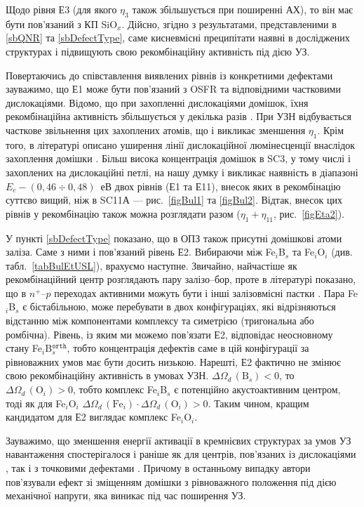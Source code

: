 Щодо рівня Е3 (для якого $\eta_3$ також збільшується при поширенні АХ),
то він має бути пов'язаний з КП SiO$_x$.
Дійсно, згідно з результатами, представленими в \ref{sbQNR} та \ref{sbDefectType},
саме кисневмісні преципітати наявні в досліджених структурах і підвищують свою рекомбінаційну активність під дією УЗ.

Повертаючись до співставлення виявлених рівнів із конкретними дефектами зауважимо,
що Е1 може бути пов'язаний з OSFR та відповідними частковими дислокаціями.
Відомо, що при захопленні дислокаціями домішок, їхня рекомбінаційна активність
збільшується у декілька разів \cite{disl10:Kveder,Kittler2003}.
При УЗН відбувається часткове звільнення цих захоплених атомів, що і викликає
зменшення  $\eta_1$.
Крім того, в літературі описано уширення  лінії дислокаційної люмінесценції внаслідок захоплення домішки  \cite{PhysRevB56:10208}.
Більш висока концентрація домішок в SC3, у тому числі і захоплених на дислокаційні петлі,
на нашу думку і викликає наявність в діапазоні $E_c-(0,46\div0,48)$~еВ двох рівнів (Е1 та Е11),
внесок яких в рекомбінацію суттєво вищий, ніж в SC11А --- рис.~\ref{figBul1} та \ref{figBul2}.
Відтак, внесок цих рівнів у рекомбінацію також можна розглядати разом ($\eta_1+\eta_{11}$, рис.~\ref{figEta2}).

У пункті \ref{sbDefectType} показано, що в ОПЗ також присутні домішкові атоми заліза.
Саме з ними і пов'язаний рівень Е2.
Вибираючи між Fe$_i$B$_s$ та Fe$_i$O$_i$ (див. табл.~\ref{tabBulEtUSL}), врахуємо наступне.
Звичайно, найчастіше як рекомбінаційний центр розглядають пару залізо--бор,
проте в літературі показано, що в $n^+$--$p$ переходах активними можуть бути і інші
залізовмісні пастки \cite{TeimurazPSS,TeimurazJAP}.
Пара  Fe$_i$B$_s$ є бістабільною, може перебувати в двох конфігураціях, які відрізняються відстанню між компонентами комплексу та симетрією (тригональна або ромбічна).
Рівень, із яким ми можемо пов'язати Е2, відповідає неосновному стану Fe$_i$B$_s^\mathtt{orth}$, тобто концентрація дефектів саме в цій конфігурації за рівноважних умов має бути досить низькою.
Нарешті, Е2 фактично не змінює свою рекомбінаційну активність в умовах УЗН.
$\Delta\Omega_d\,(\mbox{B}_s)<0$, то $\Delta\Omega_d\,(\mbox{O}_i)>0$, тобто комплекс
Fe$_i$B$_s$ є потенційно акустоактивним центром, тоді як для Fe$_i$O$_i$
$\Delta\Omega_d\,(\mbox{Fe}_i)\cdot\Delta\Omega_d\,(\mbox{O}_i)>0$.
Таким чином, кращим кандидатом для Е2 виглядає комплекс Fe$_i$O$_i$.

Зауважимо, що зменшення енергії активації в кремнієвих структурах за умов
УЗ навантаження спостерігалося і раніше як для центрів, пов'язаних із дислокаціями \cite{KorotchFTP1996}, так і з точковими дефектами \cite{Korotchenkov1995}.
Причому в останньому випадку автори пов'язували ефект зі зміщенням домішки з рівноважного положення під дією механічної напруги, яка виникає під час поширення УЗ.


